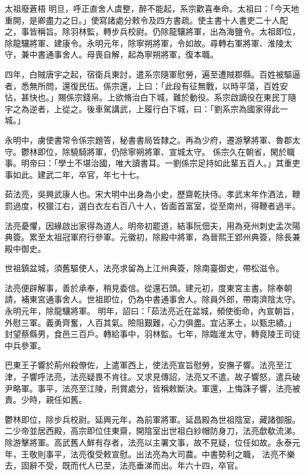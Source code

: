 \begin{pinyinscope}
 太祖廢蒼梧
 明旦，呼正直舍人虞整，醉不能起，系宗歡喜奉命。太祖曰：「今天地重開，是卿盡力之日。」使寫諸處分敕令及四方書疏。使主書十人書吏二十人配之，事皆稱旨。除羽林監，轉步兵校尉。仍除龍驤將軍，出為海鹽令。太祖即位，除龍驤將軍、建康令。永明元年，除寧朔將軍，令如故。尋轉右軍將軍、淮陵太守，兼中書通事舍人。母喪自解，起為寧朔將軍，復本職。



 四年，白賊唐宇之起，宿衛兵東討，遣系宗隨軍慰勞，遍至遭賊郡縣。百姓被驅逼者，悉無所問，還復民伍。係宗還，上曰：「此段有征無戰，以時平蕩，百姓安怗，甚快也。」賜係宗錢帛。上欲脩治白下城，難於動役。系宗啟謫役在東民丁隨宇之為逆者，上從之。後車駕講武，上履行白下城，曰：「劉系宗為國家得此一城。」



 永明中，虜使書常令係宗題答，秘書書局皆隸之。再為少府，遷游擊將軍、魯郡太守。鬱林即位，除驍騎將軍，仍除寧朔將軍、宣城太守。
 係宗久在朝省，閑於職事。明帝曰：「學士不堪治國，唯大讀書耳。一劉係宗足持如此輩五百人。」其重吏事如此。建武二年，卒官，年七十七。



 茹法亮，吳興武康人也。宋大明中出身為小史，歷齋乾扶侍。孝武末年作酒法，鞭罰過度，校獵江右，選白衣左右百八十人，皆面首富室，從至南州，得鞭者過半。



 法亮憂懼，因緣啟出家得為道人。明帝初罷道，結事阮佃夫，用為兗州刺史孟次陽典簽。累至太祖冠軍府行參軍。元徽初，除殿中將軍，為晉熙王郢州典簽，除長兼殿中御史。



 世祖鎮盆城，須舊驅使人，法亮求留為上江州典簽，除南臺御史，帶松滋令。



 法亮便辟解事，善於承奉，稍見委信。從還石頭。建元初，度東宮主書。除奉朝請，補東宮通事舍人。世祖即位，仍為中書通事舍人。除員外郎，帶南濟陰太守。永明元年，除龍驤將軍。
 明年，詔曰：「茹法亮近在盆城，頻使銜命，內宣朝旨，外慰三軍。義勇齊奮，人百其氣。險阻艱難，心力俱盡。宜沾茅土，以甄忠績。」封望蔡縣男，食邑三百戶。轉給事中，羽林監。七年，除臨淮太守，轉竟陵王司徒中兵參軍。



 巴東王子響於荊州殺僚佐，上遣軍西上，使法亮宣旨慰勞，安撫子響。法亮至江津，子響呼法亮，法亮疑畏不肯往。又求見傳詔，法亮又不遣。故子響怒，遣兵破尹略軍。事平，法亮至江陵，刑賞處分，皆稱敕斷決。軍還，上悔誅子響，法亮被責。少時，親任如舊。



 鬱林即位，除步兵校尉。延興元年，為前軍將軍。延昌殿為世祖陰室，藏諸御服。二少帝並居西殿，高宗即位住東齋，開陰室出世祖白紗帽防身刀，法亮歔欷流涕。除游擊將軍。高武舊人鮮有存者，法亮以主署文事，故不見疑，位任如故。永泰元年，王敬則事平，法亮復受敕宣慰。出法亮為大司農。中書勢利之職，
 法亮不樂去，固辭不受，既而代人已至，法亮垂涕而出。年六十四，卒官。




\end{pinyinscope}
